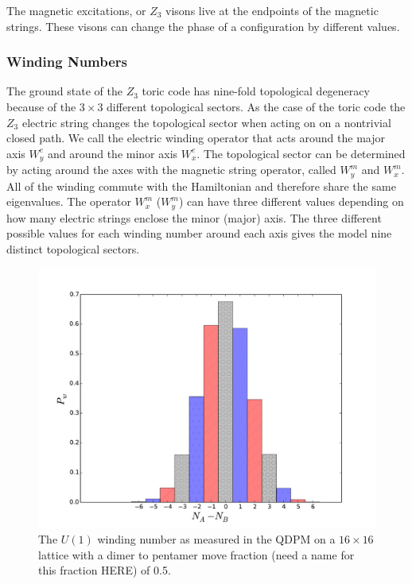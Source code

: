 \documentclass[twocolumn,prb,aps,floatfix,superscriptaddress]{revtex4-1}
\begin{document}
            The magnetic excitations, or $Z_3$ visons live at the endpoints of the magnetic
            strings.  These visons can change the phase of a configuration by different values.
            



        \subsubsection{Winding Numbers}

            The ground state of the $Z_3$ toric code has nine-fold topological degeneracy because of
            the $3\times3$ different topological sectors. As the case of the toric code the $Z_3$
            electric string changes the topological sector when acting on on a nontrivial closed
            path. We call the electric winding
            operator that acts around the major axis $W^e_y$ and around the minor axis $W^e_x$.
            The topological sector can be determined 
            by acting around the axes with the magnetic string operator, called $W^m_y$ and
            $W^m_x$. All of the winding commute with the Hamiltonian and
            therefore share the same eigenvalues. The operator $W^m_{x}$ ($W^m_{y}$) can 
            have three different values depending on how many electric strings enclose the minor
            (major) axis. The three different
            possible values for each winding number around each axis gives the model nine distinct
            topological sectors.

            \begin{figure}[htpb]
                \centering
                \includegraphics[width=0.8\linewidth]{u1_wind_qdpm.pdf}
                \caption{The $U(1)$ winding number as measured in the QDPM on a $16\times16$ lattice
                with a dimer to pentamer move fraction (need a name for this fraction HERE) of 0.5.}
                \label{fig:u1_wind_qdpm}
            \end{figure}
\end{document}

